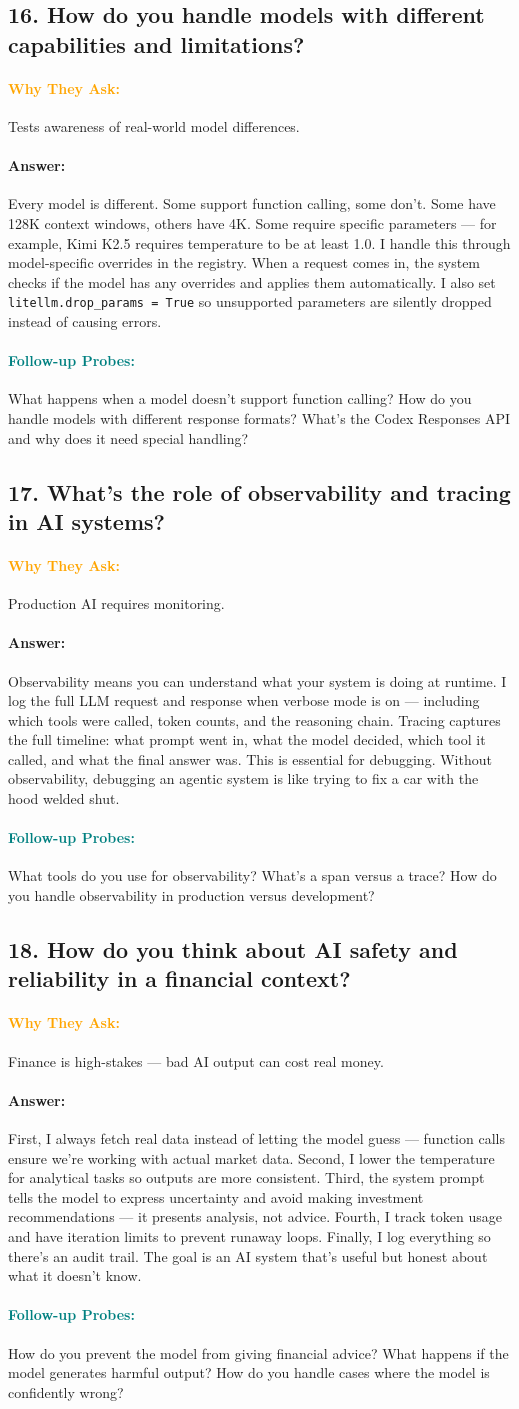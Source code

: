\documentclass[11pt,a4paper]{article}
\newcommand{\Q}[1]{\subsection{#1}}
\newcommand{\Ans}[1]{\paragraph{\textbf{Answer:}} #1}
\newcommand{\Why}{\paragraph{\textcolor{orange}{\textbf{Why They Ask:}}}}
\newcommand{\Probe}{\paragraph{\textcolor{teal}{\textbf{Follow-up Probes:}}}}
\begin{document}
\Q{16. How do you handle models with different capabilities and limitations?}
\Why Tests awareness of real-world model differences.
\Ans Every model is different. Some support function calling, some don't. Some have 128K context windows, others have 4K. Some require specific parameters --- for example, Kimi K2.5 requires temperature to be at least 1.0. I handle this through model-specific overrides in the registry. When a request comes in, the system checks if the model has any overrides and applies them automatically. I also set \texttt{litellm.drop\_params = True} so unsupported parameters are silently dropped instead of causing errors.
\Probe What happens when a model doesn't support function calling? How do you handle models with different response formats? What's the Codex Responses API and why does it need special handling?

\Q{17. What's the role of observability and tracing in AI systems?}
\Why Production AI requires monitoring.
\Ans Observability means you can understand what your system is doing at runtime. I log the full LLM request and response when verbose mode is on --- including which tools were called, token counts, and the reasoning chain. Tracing captures the full timeline: what prompt went in, what the model decided, which tool it called, and what the final answer was. This is essential for debugging. Without observability, debugging an agentic system is like trying to fix a car with the hood welded shut.
\Probe What tools do you use for observability? What's a span versus a trace? How do you handle observability in production versus development?

\Q{18. How do you think about AI safety and reliability in a financial context?}
\Why Finance is high-stakes --- bad AI output can cost real money.
\Ans First, I always fetch real data instead of letting the model guess --- function calls ensure we're working with actual market data. Second, I lower the temperature for analytical tasks so outputs are more consistent. Third, the system prompt tells the model to express uncertainty and avoid making investment recommendations --- it presents analysis, not advice. Fourth, I track token usage and have iteration limits to prevent runaway loops. Finally, I log everything so there's an audit trail. The goal is an AI system that's useful but honest about what it doesn't know.
\Probe How do you prevent the model from giving financial advice? What happens if the model generates harmful output? How do you handle cases where the model is confidently wrong?
\end{document}
